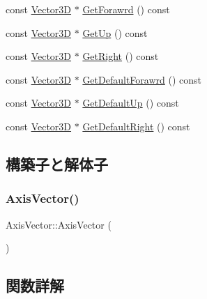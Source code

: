 \begin{DoxyCompactItemize}
\item 
const \mbox{\hyperlink{class_vector3_d}{Vector3D}} $\ast$ \mbox{\hyperlink{class_axis_vector_a79013d5b090ce9232d57f528f18e982e}{Get\+Forawrd}} () const
\item 
const \mbox{\hyperlink{class_vector3_d}{Vector3D}} $\ast$ \mbox{\hyperlink{class_axis_vector_aba45ae6f91ac516e6e42fdb8bcfcae2e}{Get\+Up}} () const
\item 
const \mbox{\hyperlink{class_vector3_d}{Vector3D}} $\ast$ \mbox{\hyperlink{class_axis_vector_a1d4f944d118d6f999c516dbdc0827a39}{Get\+Right}} () const
\item 
const \mbox{\hyperlink{class_vector3_d}{Vector3D}} $\ast$ \mbox{\hyperlink{class_axis_vector_a83ead17514eb08954dc74c0e72b6158c}{Get\+Default\+Forawrd}} () const
\item 
const \mbox{\hyperlink{class_vector3_d}{Vector3D}} $\ast$ \mbox{\hyperlink{class_axis_vector_a32f68ef0864e7b589d3c1996a61e11fc}{Get\+Default\+Up}} () const
\item 
const \mbox{\hyperlink{class_vector3_d}{Vector3D}} $\ast$ \mbox{\hyperlink{class_axis_vector_aacf0879e0b9ace6cfbd29c8a300cd960}{Get\+Default\+Right}} () const
\end{DoxyCompactItemize}


\subsection{構築子と解体子}
\mbox{\label{class_axis_vector_ae77a05cd990defedbd04914dba1f2326}} 
\subsubsection{\texorpdfstring{Axis\+Vector()}{AxisVector()}}
{\footnotesize\ttfamily Axis\+Vector\+::\+Axis\+Vector (\begin{DoxyParamCaption}{ }\end{DoxyParamCaption})}



\subsection{関数詳解}
\mbox{\label{class_axis_vector_a83ead17514eb08954dc74c0e72b6158c}} 
